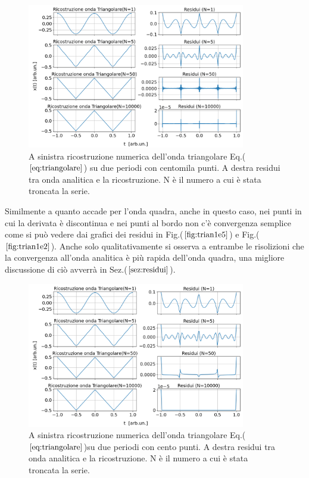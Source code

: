 \documentclass{article}
\begin{document}
        \begin{figure}[H]
            \centering
            \includegraphics[width=0.85\textwidth]{foutriawave1e5.png} %
            \caption{A sinistra ricostruzione numerica dell'onda triangolare
             Eq.($\ref{eq:triangolare}$) su due periodi con centomila punti.
            A destra residui tra onda analitica e la ricostruzione.
            N è il numero a cui è stata troncata la serie. }
            \label{fig:trian1e5}
        \end{figure}
        \noindent Similmente a quanto accade per l'onda quadra, anche in questo caso, nei punti 
        in cui la derivata è discontinua e nei punti al bordo non c'è convergenza
        semplice come si può vedere dai grafici dei residui in Fig.($\ref{fig:trian1e5}$) e 
        Fig.($\ref{fig:trian1e2}$).
        Anche solo qualitativamente si osserva a entrambe le risolizioni che 
        la convergenza all'onda analitica è più rapida dell'onda quadra, una migliore discussione di ciò avverrà in
        Sez.($\ref{sez:residui}$).
        \begin{figure}[H]
            \centering
            \includegraphics[width=0.85\textwidth]{foutriawave1e2.png} %
            \caption{A sinistra ricostruzione numerica dell'onda triangolare
            Eq.($\ref{eq:triangolare}$)su due periodi con cento punti.
           A destra residui tra onda analitica e la ricostruzione.
           N è il numero a cui è stata troncata la serie. }
            \label{fig:trian1e2}
        \end{figure}        
        
\end{document}
